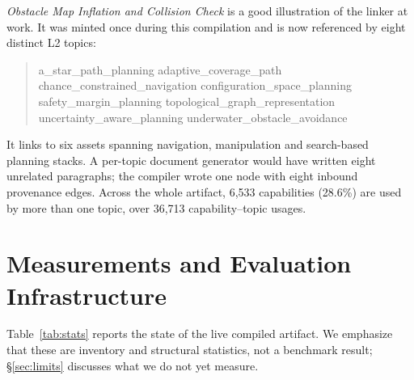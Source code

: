 \documentclass[10pt,a4paper]{article}
\begin{document}
\emph{Obstacle Map Inflation and Collision Check} is a good
illustration of the linker at work. It was minted once during this compilation
and is now referenced by eight distinct L2 topics:

\begin{quote}\ttfamily\small
a\_star\_path\_planning \quad adaptive\_coverage\_path\\
chance\_constrained\_navigation \quad configuration\_space\_planning\\
safety\_margin\_planning \quad topological\_graph\_representation\\
uncertainty\_aware\_planning \quad underwater\_obstacle\_avoidance
\end{quote}

\noindent It links to six assets spanning
navigation, manipulation and search-based planning stacks. A per-topic document
generator would have written eight unrelated paragraphs; the compiler wrote one
node with eight inbound provenance edges. Across the whole artifact, 6{,}533 capabilities (28.6\%) are used by
more than one topic, over 36{,}713 capability--topic usages.

\section{Measurements and Evaluation Infrastructure}
\label{sec:eval}

Table~\ref{tab:stats} reports the state of the live compiled artifact. We
emphasize that these are inventory and structural statistics, not a benchmark
result; \S\ref{sec:limits} discusses what we do not yet measure.
\end{document}
